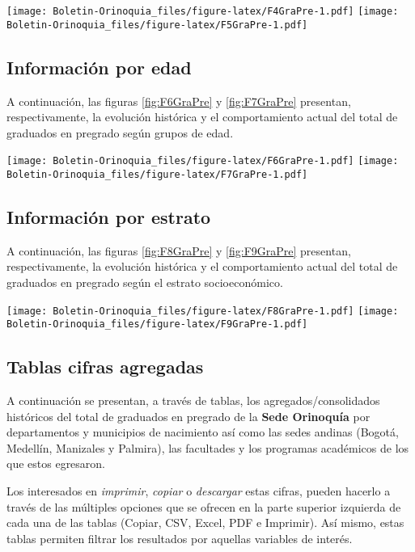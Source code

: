 \documentclass[
]{book}
\begin{document}
\texttt{[image: Boletin-Orinoquia\_files/figure-latex/F4GraPre-1.pdf]}
\texttt{[image: Boletin-Orinoquia\_files/figure-latex/F5GraPre-1.pdf]}

\hypertarget{informaciuxf3n-por-edad-5}{%
\subsection{Información por edad}\label{informaciuxf3n-por-edad-5}}

A continuación, las figuras \ref{fig:F6GraPre} y \ref{fig:F7GraPre} presentan, respectivamente, la evolución histórica y el comportamiento actual del total de graduados en pregrado según grupos de edad.

\texttt{[image: Boletin-Orinoquia\_files/figure-latex/F6GraPre-1.pdf]}
\texttt{[image: Boletin-Orinoquia\_files/figure-latex/F7GraPre-1.pdf]}

\hypertarget{informaciuxf3n-por-estrato-3}{%
\subsection{Información por estrato}\label{informaciuxf3n-por-estrato-3}}

A continuación, las figuras \ref{fig:F8GraPre} y \ref{fig:F9GraPre} presentan, respectivamente, la evolución histórica y el comportamiento actual del total de graduados en pregrado según el estrato socioeconómico.

\texttt{[image: Boletin-Orinoquia\_files/figure-latex/F8GraPre-1.pdf]}
\texttt{[image: Boletin-Orinoquia\_files/figure-latex/F9GraPre-1.pdf]}

\hypertarget{tablas-cifras-agregadas-5}{%
\subsection{Tablas cifras agregadas}\label{tablas-cifras-agregadas-5}}

A continuación se presentan, a través de tablas, los agregados/consolidados históricos del total de graduados en pregrado de la \textbf{Sede Orinoquía} por departamentos y municipios de nacimiento así como las sedes andinas (Bogotá, Medellín, Manizales y Palmira), las facultades y los programas académicos de los que estos egresaron.

Los interesados en \emph{imprimir}, \emph{copiar} o \emph{descargar} estas cifras, pueden hacerlo a través de las múltiples opciones que se ofrecen en la parte superior izquierda de cada una de las tablas (Copiar, CSV, Excel, PDF e Imprimir). Así mismo, estas tablas permiten filtrar los resultados por aquellas variables de interés.
\end{document}
